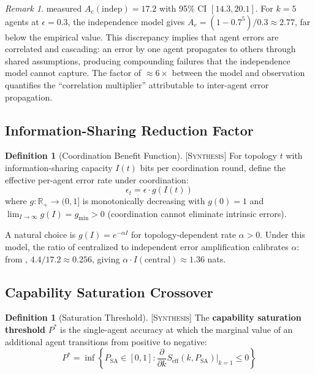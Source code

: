 \documentclass[11pt]{article}
\theoremstyle{definition}
\newtheorem{definition}[theorem]{Definition}
\theoremstyle{remark}
\newtheorem{remark}[theorem]{Remark}
\newcommand{\synthesis}{\textsc{[Synthesis]}}
\begin{document}
\begin{remark}
\label{rem:discrepancy}
\citet{Kim2025} measured $A_e(\mathrm{indep}) = 17.2$ with 95\% CI $[14.3, 20.1]$.
For $k = 5$ agents at $\epsilon = 0.3$, the independence model gives $A_e = (1 - 0.7^5)/0.3 \approx 2.77$, far below the empirical value.
This discrepancy implies that agent errors are correlated and cascading: an error by one agent propagates to others through shared assumptions, producing compounding failures that the independence model cannot capture.
The factor of $\approx 6\times$ between the model and observation quantifies the ``correlation multiplier'' attributable to inter-agent error propagation.
\end{remark}

\subsection{Information-Sharing Reduction Factor}

\begin{definition}[Coordination Benefit Function] \synthesis{}
\label{def:coord-benefit}
For topology $t$ with information-sharing capacity $I(t)$ bits per coordination round, define the effective per-agent error rate under coordination:
\begin{equation}
  \epsilon_t = \epsilon \cdot g(I(t))
\end{equation}
where $g: \mathbb{R}_+ \to (0, 1]$ is monotonically decreasing with $g(0) = 1$ and $\lim_{I \to \infty} g(I) = g_{\min} > 0$ (coordination cannot eliminate intrinsic errors).
\end{definition}

A natural choice is $g(I) = e^{-\alpha I}$ for topology-dependent rate $\alpha > 0$.
Under this model, the ratio of centralized to independent error amplification calibrates $\alpha$: from \citet{Kim2025}, $4.4/17.2 \approx 0.256$, giving $\alpha \cdot I(\mathrm{central}) \approx 1.36$ nats.

\subsection{Capability Saturation Crossover}

\begin{definition}[Saturation Threshold] \synthesis{}
\label{def:saturation}
The \textbf{capability saturation threshold} $P^*$ is the single-agent accuracy at which the marginal value of an additional agent transitions from positive to negative:
\begin{equation}
  P^* = \inf \left\{ P_{\mathrm{SA}} \in [0,1] : \frac{\partial}{\partial k} S_{\mathrm{eff}}(k, P_{\mathrm{SA}}) \Big|_{k=1} \leq 0 \right\}
\end{equation}
\end{definition}
\end{document}
